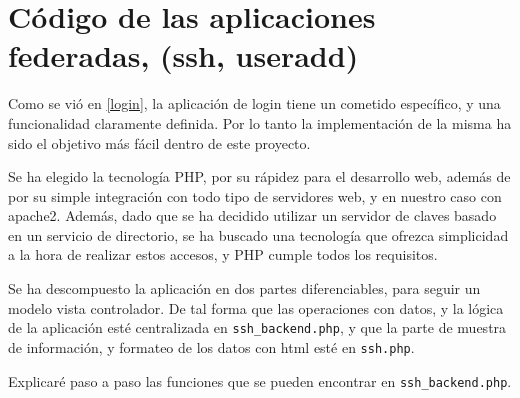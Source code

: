     \section{Código de las aplicaciones federadas, (ssh, useradd)}

    Como se vió en \ref{login}, la aplicación de login tiene un cometido
    específico, y una funcionalidad claramente definida. Por lo tanto la
    implementación de la misma ha sido el objetivo más fácil dentro de este
    proyecto.

    Se ha elegido la tecnología PHP, por su rápidez para el desarrollo web,
    además de por su simple integración con todo tipo de servidores web, y
    en nuestro caso con apache2. Además, dado que se ha decidido utilizar
    un servidor de claves basado en un servicio de directorio, se ha
    buscado una tecnología que ofrezca simplicidad a la hora de realizar
    estos accesos, y PHP cumple todos los requisitos.

    Se ha descompuesto la aplicación en dos partes diferenciables, para
    seguir un modelo vista controlador. De tal forma que las operaciones
    con datos, y la lógica de la aplicación esté centralizada en
    \texttt{ssh\_backend.php}, y que la parte de muestra de información, y
    formateo de los datos con html esté en \texttt{ssh.php}.

    Explicaré paso a paso las funciones que se pueden encontrar en
    \texttt{ssh\_backend.php}.
    
